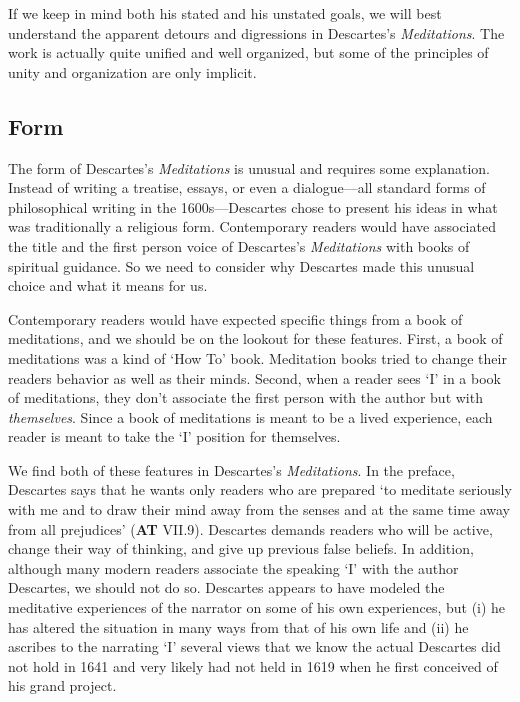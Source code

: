 If we keep in mind both his stated and his unstated goals, we will best understand the apparent detours and digressions in Descartes's \textit{Meditations}. The work is actually quite unified and well organized, but some of the principles of unity and organization are only implicit.

\subsection*{Form}

The form of Descartes's \textit{Meditations} is unusual and requires some explanation. Instead of writing a treatise, essays, or even a dialogue---all standard forms of philosophical writing in the 1600s---Descartes chose to present his ideas in what was traditionally a religious form. Contemporary readers would have associated the title and the first person voice of Descartes's \textit{Meditations} with books of spiritual guidance. So we need to consider why Descartes made this unusual choice and what it means for us.

Contemporary readers would have expected specific things from a book of meditations, and we should be on the lookout for these features. First, a book of meditations was a kind of `How To' book. Meditation books tried to change their readers behavior as well as their minds. Second, when a reader sees `I' in a book of meditations, they don't associate the first person with the author but with \textit{themselves}. Since a book of meditations is meant to be a lived experience, each reader is meant to take the `I' position for themselves.

We find both of these features in Descartes's \textit{Meditations}. In the preface, Descartes says that he wants only readers who are prepared `to meditate seriously with me and to draw their mind away from the senses and at the same time away from all prejudices' (\textbf{AT} VII.9). Descartes demands readers who will be active, change their way of thinking, and give up previous false beliefs. In addition, although many modern readers associate the speaking `I' with the author Descartes, we should not do so. Descartes appears to have modeled the meditative experiences of the narrator on some of his own experiences, but (i) he has altered the situation in many ways from that of his own life and (ii) he ascribes to the narrating `I' several views that we know the actual Descartes did not hold in 1641 and very likely had not held in 1619 when he first conceived of his grand project.

